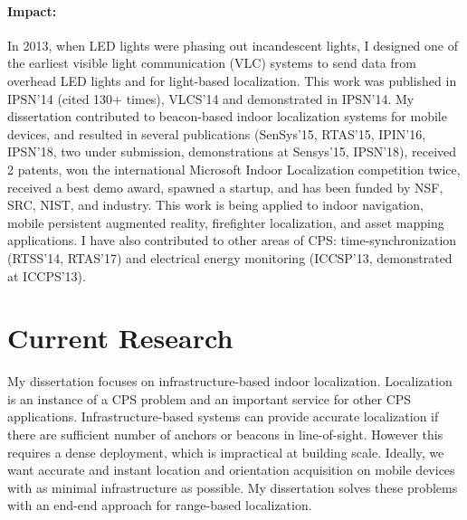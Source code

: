 \documentclass[10pt]{article}
\begin{document}



\paragraph{Impact:}  In 2013, when LED lights were phasing out
incandescent lights, I designed one of the earliest visible light
communication (VLC) systems to send data from overhead LED lights and
for light-based localization. This work was published in IPSN'14
(cited 130+ times), VLCS'14 and demonstrated in IPSN'14.  My
dissertation contributed to beacon-based indoor localization systems
for mobile devices, and resulted in several publications (SenSys'15,
RTAS'15, IPIN'16, IPSN'18, two under submission, demonstrations at
Sensys'15, IPSN'18), received 2 patents, won the international
Microsoft Indoor Localization competition twice, received a best demo
award, spawned a startup, and has been funded by NSF, SRC, NIST, and
industry. This work is being applied to indoor navigation, mobile
persistent augmented reality, firefighter localization, and asset
mapping applications.  I have also contributed to other areas of CPS:
time-synchronization (RTSS'14, RTAS'17) and electrical energy
monitoring (ICCSP'13, demonstrated at ICCPS'13).

\section{Current Research}

My dissertation focuses on infrastructure-based indoor
localization. Localization is an instance of a CPS problem and an
important service for other CPS applications. Infrastructure-based
systems can provide accurate localization if there are sufficient
number of anchors or beacons in line-of-sight. However this requires a
dense deployment, which is impractical at building scale. Ideally, we
want accurate and instant location and orientation acquisition on
mobile devices with as minimal infrastructure as possible. My
dissertation solves these problems with an end-end approach for
range-based localization.
\end{document}
